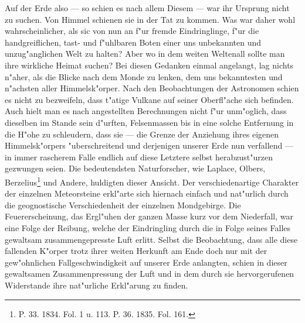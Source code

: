 \documentclass[a4paper, 8pt, oneside, polutonikogreek, german]{article}
\begin{document}
Auf der Erde also — so schien es nach allem Diesem — war ihr Ursprung nicht zu suchen. Von Himmel schienen sie in der Tat zu kommen. Was war daher wohl wahrscheinlicher, als sic von nun an f"ur fremde Eindringlinge, f"ur die handgreiflichen, tast- und f"uhlbaren Boten einer uns unbekannten und unzug"anglichen Welt zu halten? Aber wo in dem weiten Weltenall sollte man ihre wirkliche Heimat suchen? Bei diesen Gedanken einmal angelangt, lag nichts n"aher, als die Blicke nach dem Monde zu lenken, dem uns bekanntesten und n"achsten aller Himmelsk"orper. Nach den Beobachtungen der Astronomen schien es nicht zu bezweifeln, dass t"atige Vulkane auf seiner Oberfl"ache sich befinden. Auch hielt man es nach angestellten Berechnungen nicht f"ur unm"oglich, dass dieselben im Stande sein d"urften, Felsenmassen bis in eine solche Entfernung in die H"ohe zu schleudern, dass sie — die Grenze der Anziehung ihres eigenen Himmelsk"orpers "uberschreitend und derjenigen unserer Erde nun verfallend — in immer rascherem Falle endlich auf diese Letztere selbst herabzust"urzen gezwungen seien. Die bedeutendsten Naturforscher, wie Laplace, Olbers, Berzelius\footnote{P. 33. 1834. Fol. 1 u. 113. P. 36. 1835. Fol. 161.} und Andere, huldigten dieser Ansicht. Der verschiedenartige Charakter der einzelnen Meteorsteine erkl"arte sich hiernach einfach und nat"urlich durch die geognostische Verschiedenheit der einzelnen Mondgebirge. Die Feuererscheinung, das Ergl"uhen der ganzen Masse kurz vor dem Niederfall, war eine Folge der Reibung, welche der Eindringling durch die in Folge seines Falles gewaltsam zusammengepresste Luft erlitt. Selbst die Beobachtung, dass alle diese fallenden K"orper trotz ihrer weiten Herkunft am Ende doch nur mit der gew"ohnlichen Fallgeschwindigkeit auf unserer Erde anlangten, schien in dieser gewaltsamen Zusammenpressung der Luft und in dem durch sie hervorgerufenen Widerstande ihre nat"urliche Erkl"arung zu finden.
\end{document}
